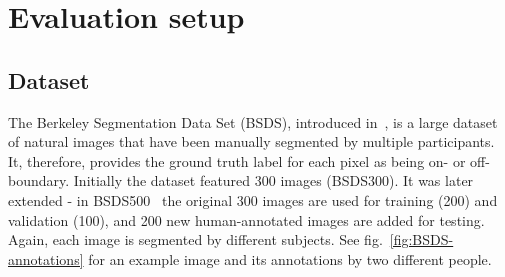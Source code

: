 \section{Evaluation setup}
\subsection{Dataset}
The Berkeley Segmentation Data Set (BSDS), introduced in~\cite{Martin01}, is a large dataset of natural images that have been manually segmented by multiple participants. It, therefore, provides the ground truth label for each pixel as being on- or off-boundary. Initially the dataset featured 300 images (BSDS300). It was later extended - in BSDS500~\cite{Arbelaez11} the original 300 images are used for training (200) and validation (100), and 200 new human-annotated images are added for testing. Again, each image is segmented by different subjects. See fig.~\ref{fig:BSDS-annotations} for an example image and its annotations by two different people.


